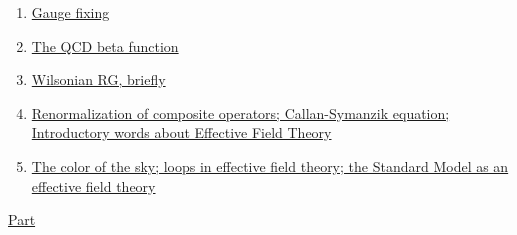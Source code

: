 \documentclass[11pt]{article}
\begin{document}
\begin{enumerate}
	\item 	\href{https://mp.weixin.qq.com/s/lWyGjY32rrsCGSIjXJgfqg}{Gauge fixing}	%
	\item 	\href{https://mp.weixin.qq.com/s/z2i_K17ZmsKJi0xNIWAF2Q}{The QCD beta function}	%
	\item 	\href{https://mp.weixin.qq.com/s/w6kl-LYCqSQwfV74ygXyRQ}{Wilsonian RG, briefly}	%
	\item 	\href{https://mp.weixin.qq.com/s/IKtkrHaXQW_TXlx7QSRiHw}{Renormalization of composite operators; Callan-Symanzik equation; Introductory words about Effective Field Theory}	%
	\item 	\href{https://mp.weixin.qq.com/s/DrhuAefaVrNwbnmK-0CQMQ}{The color of the sky; loops in effective field theory; the Standard Model as an effective field theory}	%
\end{enumerate}

\newpage 

\begin{center}
	{\large  \href{https://mcgreevy.physics.ucsd.edu/s22/index.html}{Part }}
\end{center}
	
\vspace{-1cm}
\end{document}

